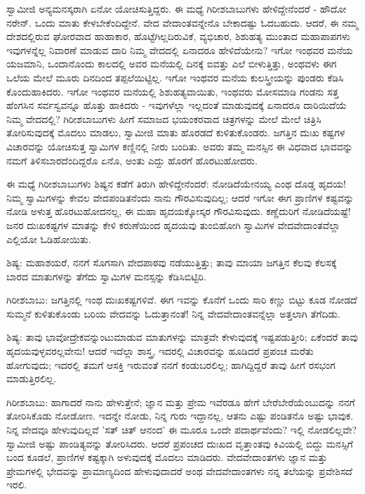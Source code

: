 ಸ್ವಾಮೀಜಿ ಅನ್ಯಮನಸ್ಕರಾಗಿ ಏನೋ ಯೋಚಿಸುತ್ತಿದ್ದರು. ಈ ಮಧ್ಯೆ ಗಿರೀಶಬಾಬುಗಳು ಹೇಳಿದ್ದೇನೆಂದರೆ - ಹೌದೋ ನರೇನ್. ಒಂದು ಮಾತು ಕೇಳಬೇಕೆಂದಿದ್ದೇನೆ. ವೇದ ವೇದಾಂತವನ್ನೇನೊ ಬೇಕಾದಷ್ಟು ಓದಬಹುದು. ಆದರೆ, ಈ ನಮ್ಮ ದೇಶದಲ್ಲಿರುವ ಘೋರವಾದ ಹಾಹಾಕಾರ, ಹೊಟ್ಟೆಗಿಲ್ಲದಿರುವಿಕೆ, ವ್ಯಭಿಚಾರ, ಶಿಶುಹತ್ಯ ಮುಂತಾದ ಮಹಾಪಾಪಗಳು ಇವುಗಳನ್ನೆಲ್ಲ ನಿವಾರಣೆ ಮಾಡುವ ದಾರಿ ನಿಮ್ಮ ವೇದದಲ್ಲಿ ಏನಾದರೂ ಹೇಳಿದೆಯೇನು? ಇಗೋ ಇಂಥವರ ಮನೆಯ ಯಜಮಾನಿ, ಒಂದಾನೊಂದು ಕಾಲದಲ್ಲಿ ಅವರ ಮನೆಯಲ್ಲಿ ದಿನಕ್ಕೆ ಐವತ್ತು ಎಲೆ ಬೀಳುತ್ತಿತ್ತು, ಅಂಥವಳು ಈಗ ಒಲೆಯ ಮೇಲೆ ಮೂರು ದಿನದಿಂದ ತಪ್ಪಲೆಯಿಟ್ಟಿಲ್ಲ. ಇಗೋ ಇಂಥವರ ಮನೆಯ ಕುಲಸ್ತ್ರೀಯನ್ನು ಪುಂಡರು ಕೆಡಿಸಿ ಕೊಂದುಹಾಕಿದರು. ಇಗೋ ಇಂಥವರ ಮನೆಯಲ್ಲಿ ಶಿಶುಹತ್ಯವಾಯಿತು, ಇಂಥವರು ಮೋಸಮಾಡಿ ಗಂಡನು ಸತ್ತ ಹೆಂಗಸಿನ ಸರ್ವಸ್ವವನ್ನೂ ಹೊತ್ತು ಹಾಕಿದರು - ಇವುಗಳೆಲ್ಲಾ ಇಲ್ಲದಂತೆ ಮಾಡುವುದಕ್ಕೆ ಏನಾದರೂ ದಾರಿಯಿದೆಯೆ ನಿಮ್ಮ ವೇದದಲ್ಲಿ? ಗಿರೀಶಬಾಬುಗಳು ಹೀಗೆ ಸಮಾಜದ ಭಯಂಕರವಾದ ಚಿತ್ರಗಳನ್ನು ಮೇಲೆ ಮೇಲೆ ಚಿತ್ರಿಸಿ ತೋರಿಸುವುದಕ್ಕೆ ಮೊದಲು ಮಾಡಲು, ಸ್ವಾಮೀಜಿ ಮಾತು ಹೊರಡದೆ ಕುಳಿತುಕೊಂಡರು. ಜಗತ್ತಿನ ದುಃಖ ಕಷ್ಟಗಳ ವಿಚಾರವನ್ನು ಯೋಚಿಸುತ್ತ ಸ್ವಾಮಿಗಳ ಕಣ್ಣಿನಲ್ಲಿ ನೀರು ಬಂದಿತು. ಅವರು ತಮ್ಮ ಮನಸ್ಸಿನ ಈ ವಿಧವಾದ ಭಾವವನ್ನು ನಮಗೆ ತಿಳಿಸಬಾರದೆಂದಿದ್ದರೊ ಏನೊ, ಅಂತು ಎದ್ದು ಹೊರಗೆ ಹೊರಟುಹೋದರು.

ಈ ಮಧ್ಯೆ ಗಿರೀಶಬಾಬುಗಳು ಶಿಷ್ಯನ ಕಡೆಗೆ ತಿರುಗಿ ಹೇಳಿದ್ದೇನೆಂದರೆ: ನೋಡಿದೆಯೇನಯ್ಯ ಎಂಥ ದೊಡ್ಡ ಹೃದಯ! ನಿಮ್ಮ ಸ್ವಾಮಿಗಳನ್ನು ಕೇವಲ ವೇದಪಂಡಿತನೆಂದು ನಾನು ಗೌರವಿಸುವುದಿಲ್ಲ; ಆದರೆ ಇಗೋ ಈಗ ಪ್ರಾಣಿಗಳ ಕಷ್ಟವನ್ನು ನೋಡಿ ಅಳುತ್ತ ಹೊರಟುಹೋದನಲ್ಲ, ಈ ಮಹಾ ಹೃದಯಕ್ಕೋಸ್ಕರ ಗೌರವಿಸುವುದು. ಕಣ್ಣೆದುರಿಗೆ ನೋಡಿದೆಯಷ್ಟೆ! ಜನರ ದುಃಖಕಷ್ಟಗಳ ಮಾತನ್ನು ಕೇಳಿ ಕರುಣೆಯಿಂದ ಹೃದಯವು ತುಂಬಿಹೋಗಿ ಸ್ವಾಮಿಗಳ ವೇದವೇದಾಂತವೆಲ್ಲಾ ಎಲ್ಲಿಯೋ ಓಡಿಹೋಯಿತು.

ಶಿಷ್ಯ: ಮಹಾಶಯರೆ, ನನಗೆ ಸೊಗಸಾಗಿ ವೇದಪಾಠವು ನಡೆಯುತ್ತಿತ್ತು; ತಾವು ಮಾಯಾ ಜಗತ್ತಿನ ಕೆಲವು ಕೆಲಸಕ್ಕೆ ಬಾರದ ಮಾತುಗಳನ್ನು ತೆಗೆದು ಸ್ವಾಮಿಗಳ ಮನಸ್ಸನ್ನು ಕೆಡಿಸಿಬಿಟ್ಟಿರಿ.

ಗಿರೀಶಬಾಬು: ಜಗತ್ತಿನಲ್ಲಿ ಇಂಥ ದುಃಖಕಷ್ಟಗಳಿವೆ. ಈಗ ಇವನ್ನು ಕೊನೆಗೆ ಒಂದು ಸಾರಿ ಕಣ್ಣು ಬಿಟ್ಟು ಕೂಡ ನೋಡದೆ ಸುಮ್ಮನೆ ಕುಳಿತುಕೊಂಡು ಬರಿಯ ವೇದವನ್ನು ಓದುತ್ತಾನಂತೆ! ನಿನ್ನ ವೇದವೇದಾಂತವನ್ನೆಲ್ಲಾ ಅತ್ತಲಾಗಿ ತೆಗೆದಿಡು.

ಶಿಷ್ಯ: ತಾವು ಭಾವೋದ್ರೇಕವನ್ನುಂಟುಮಾಡುವ ಮಾತುಗಳನ್ನು ಮಾತ್ರವೇ ಕೇಳುವುದಕ್ಕೆ ಇಷ್ಟಪಡುತ್ತೀರಿ; ಏಕೆಂದರೆ ತಾವು ಹೃದಯವುಳ್ಳವರಲ್ಲವೇನು! ಆದರೆ ಇದೆಲ್ಲಾ ಶಾಸ್ತ್ರ, ಇದರಲ್ಲಿ ವಿಚಾರವನ್ನು ಹೂಡಿದರೆ ಪ್ರಪಂಚ ಮರೆತು ಹೋಗುವುದು; ಇದರಲ್ಲಿ ತಮಗೆ ಆಸಕ್ತಿ ಇರುವಂತೆ ನನಗೆ ಕಂಡುಬರಲಿಲ್ಲ; ಹಾಗಿದ್ದಿದ್ದರೆ ತಾವು ಹೀಗೆ ರಸಭಂಗ ಮಾಡುತ್ತಿರಲಿಲ್ಲ.

ಗಿರೀಶಬಾಬು: ಹಾಗಾದರೆ ನಾನು ಹೇಳುತ್ತೇನೆ; ಜ್ಞಾನ ಮತ್ತು ಪ್ರೇಮ ಇವೆರಡೂ ಹೇಗೆ ಬೇರೆಬೇರೆಯೆಂಬುದನ್ನು ನನಗೆ ತೋರಿಸಿಕೊಡು ನೋಡೋಣ. ಇದನ್ನೇ ನೋಡು, ನಿನ್ನ ಗುರು ಇದ್ದಾನಲ್ಲ, ಆತನು ಎಷ್ಟು ಪಂಡಿತನೊ ಅಷ್ಟು ಭಾವುಕ. ನಿನ್ನ ವೇದವೂ ಹೇಳುವುದಿಲ್ಲವೆ 'ಸತ್ ಚಿತ್ ಆನಂದ' ಈ ಮೂರೂ ಒಂದೇ ಪದಾರ್ಥವೆಂದು? ಇಲ್ಲಿ ನೋಡಲಿಲ್ಲವೇ? ಸ್ವಾಮೀಜಿ ಅಷ್ಟು ಪಾಂಡಿತ್ಯವನ್ನು ತೋರಿಸಿದರು. ಆದರೆ ಪ್ರಪಂಚದ ದುಃಖದ ವೃತ್ತಾಂತವು ಕಿವಿಯಲ್ಲಿ ಬಿದ್ದು ಮನಸ್ಸಿಗೆ ಬಂದ ಕೂಡಲೆ, ಪ್ರಾಣಿಗಳ ಕಷ್ಟಕ್ಕಾಗಿ ಅಳುವುದಕ್ಕೆ ಮೊದಲು ಮಾಡಿದರು. ವೇದವೇದಾಂತಗಳು ಜ್ಞಾನ ಮತ್ತು ಪ್ರೇಮಗಳಲ್ಲಿ ಭೇದವನ್ನು ಪ್ರಾಮಾಣ್ಯದಿಂದ ಹೇಳುವುದಾದರೆ ಅಂಥ ವೇದವೇದಾಂತಗಳು ನನ್ನ ತಲೆಯನ್ನು ಪ್ರವೇಶಿಸದೆ ಇರಲಿ.

